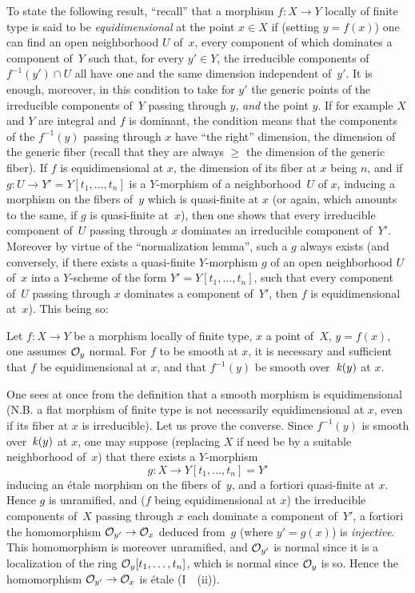 To
state the following result, ``recall'' that a morphism
$f\colon X\to Y$ locally of finite type is said to be
\emph{equidimensional}
at the point $x\in X$ if (setting $y=f(x)$) one can find an open
neighborhood $U$ of~$x$, every component of which dominates a component of~$Y$
such that, for every $y'\in Y$, the irreducible components of
$f^{-1}(y')\cap U$ all have one and the same dimension
independent of~$y'$. It is enough, moreover, in this condition to
take for $y'$ the generic points of the irreducible
components of~$Y$ passing through $y$, \emph{and} the point $y$. If
for example $X$ and $Y$ are integral and $f$ is dominant, the condition
means that the components of the $f^{-1}(y)$ passing through $x$ have ``the
right'' dimension, \ie the dimension of the generic fiber
(recall that they are always $\ge$ the dimension of the
generic fiber). If $f$ is equidimensional at $x$, the
dimension of its fiber at $x$ being $n$, and if $g\colon U\to
Y'=Y[t_{1},\dots,t_{n}]$ is a $Y$-morphism of a neighborhood~$U$ of
$x$, inducing a morphism on the fibers of~$y$ which is quasi-finite
at $x$ (or again, which amounts to the same, if $g$ is quasi-finite
at~$x$), then one shows that every irreducible component of~$U$
passing through $x$ dominates an irreducible component of~$Y'$. Moreover by virtue of the ``normalization lemma'', such a $g$
always exists (and conversely, if there exists a quasi-finite $Y$-morphism
$g$ of an open neighborhood $U$ of~$x$ into a $Y$-scheme
of the form $Y'=Y[t_{1},\dots,t_{n}]$, such that every component of~$U$ passing through $x$ dominates a component of~$Y'$, then $f$ is
equidimensional at~$x$). This being so:

\begin{proposition}
\label{II.2.3}
Let $f\colon X\to Y$ be a morphism locally of finite type, $x$ a
point of~$X$, $y=f(x)$, one assumes $\cal{O}_{y}$ normal. For $f$
to be smooth at $x$, it is necessary and sufficient that $f$ be
equidimensional at $x$, and that $f^{-1}(y)$ be smooth over~$\kres(y)$
at $x$.
\end{proposition}

One sees at once from the definition that a smooth morphism is
equidimensional (N.B. a flat morphism of finite type is not
necessarily equidimensional at $x$, even if its fiber
at $x$ is irreducible). Let us prove the converse. Since
$f^{-1}(y)$ is smooth over~$\kres(y)$ at $x$, one may suppose (replacing $X$ if need be by a suitable neighborhood of~$x$) that there exists
a $Y$-morphism
\[
g\colon X\to Y[t_{1},\dots,t_{n}]=Y'
\]
inducing an \'etale morphism on the fibers of~$y$, and a fortiori
quasi-finite at $x$. Hence
$g$ is unramified, and ($f$ being equidimensional at
$x$) the irreducible components of~$X$ passing through $x$ each dominate
a component of~$Y'$, a fortiori the homomorphism
$\cal{O}_{y'}\to\cal{O}_{x}$ deduced from~$g$ (where $y'=g(x)$) is
\emph{injective}. This homomorphism is moreover unramified, and
$\cal{O}_{y'}$ is normal since it is a localization of the ring
$\cal{O}_{y}[t_{1},\dots,t_{n}]$, which is normal since
$\cal{O}_{y}$ is so. Hence the homomorphism $\cal{O}_{y'}\to\cal{O}_{x}$
is \'etale (I~~(ii)).

